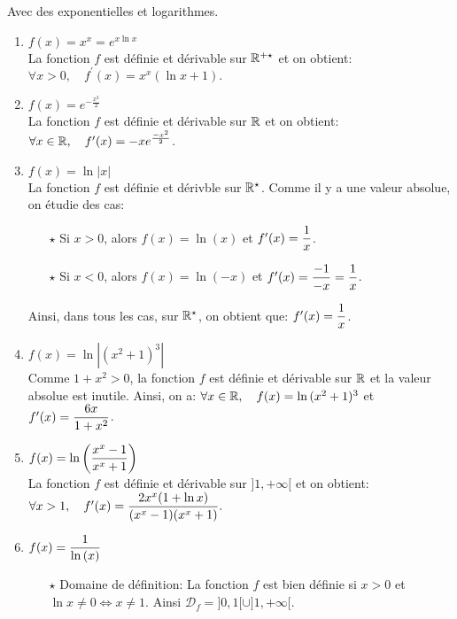 \documentclass[a4paper, 11pt,reqno]{article}
\begin{document}
\begin{correction}  \; Avec des exponentielles et logarithmes.\\
	\begin{enumerate}
		\item $f(x)=x^x=e^{x\ln{x}}$\\
		      \noindent  La fonction $f$ est d\'efinie et d\'erivable sur $\mathbb{R}^{+\star}$ et on obtient:
		      $\forall x>0,\quad f^{\prime}(x)=x^x\left( \ln{x}+1\right).$
		\item
		      $f(x)=e^{-\frac{x^2}{2}}$\\
		      \noindent  La fonction $f$ est d\'efinie et d\'erivable sur $\mathbb{R}$ et on obtient:
		      $\forall x\in\mathbb{R},\quad f^{\prime}(x)=-xe^{\frac{-x^2}{2}}$.
		\item $f(x)=\ln{|x|}$\\
		      \noindent  La fonction $f$ est d\'efinie et d\'erivble sur $\mathbb{R}^{\star}$. Comme il y a une valeur absolue, on \'etudie des cas:
		      \begin{itemize}
			      \item[$\star$] Si $x> 0$, alors $f(x)=\ln{(x)}$ et $f^{\prime}(x)=\displaystyle\frac{1}{x}$.
			      \item[$\star$]  Si $x< 0$, alors $f(x)=\ln{(-x)}$ et $f^{\prime}(x)=\displaystyle\frac{-1}{-x}=\displaystyle\frac{1}{x}$.
		      \end{itemize}
		      Ainsi, dans tous les cas, sur $\mathbb{R}^{\star}$, on obtient que: $f^{\prime}(x)=\displaystyle\frac{1}{x}$.
		\item
		      $f(x)=\ln{|(x^2+1)^3|}$\\
		      \noindent Comme $1+x^2>0$, la fonction $f$ est d\'efinie et d\'erivable sur $\mathbb{R}$ et la valeur absolue est inutile. Ainsi, on a: $\forall x\in\mathbb{R},\quad f(x)=\ln{(x^2+1)^3}$ et $f^{\prime}(x)=\displaystyle\frac{6x}{1+x^2}$.
		\item $f(x)=\ln{\left(\displaystyle\frac{x^x-1}{x^x+1}  \right)}$\\
		      \noindent La fonction $f$ est d\'efinie et d\'erivable sur $\rbrack 1,+\infty\lbrack$ et on obtient:
		      $\forall x>1,\quad f^{\prime}(x)=\displaystyle\frac{2x^x(1+\ln{x})}{(x^x-1)(x^x+1)}.$
		\item $f(x)=\displaystyle\frac{1}{\ln{(x)}}$\\
		      \begin{itemize}
			      \item[$\star$] Domaine de d\'efinition: La fonction $f$ est bien d\'efinie si $x>0$ et $\ln{x}\not= 0\Leftrightarrow x\not= 1$. Ainsi $\mathcal{D}_f=\rbrack 0,1\lbrack\cup\rbrack 1,+\infty\lbrack$.

\end{itemize}
\end{enumerate}
\end{correction}
\end{document}
